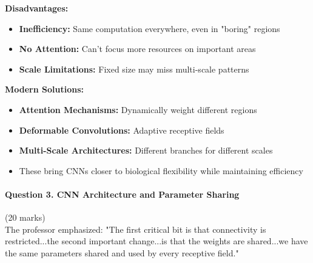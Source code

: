\documentclass[12pt]{article}
\begin{document}
\begin{enumerate}[(a)]
{{    \textbf{Disadvantages:}
    \begin{itemize}
        \item \textbf{Inefficiency:} Same computation everywhere, even in "boring" regions
        \item \textbf{No Attention:} Can't focus more resources on important areas
        \item \textbf{Scale Limitations:} Fixed size may miss multi-scale patterns
    \end{itemize}
    
    \textbf{Modern Solutions:}
    \begin{itemize}
        \item \textbf{Attention Mechanisms:} Dynamically weight different regions
        \item \textbf{Deformable Convolutions:} Adaptive receptive fields
        \item \textbf{Multi-Scale Architectures:} Different branches for different scales
        \item These bring CNNs closer to biological flexibility while maintaining efficiency
    \end{itemize}
    }
    }
\end{enumerate}

\newpage
\paragraph{Question 3. CNN Architecture and Parameter Sharing}{\hfill (20 marks)}\\
The professor emphasized: "The first critical bit is that connectivity is restricted...the second important change...is that the weights are shared...we have the same parameters shared and used by every receptive field."
\end{document}
